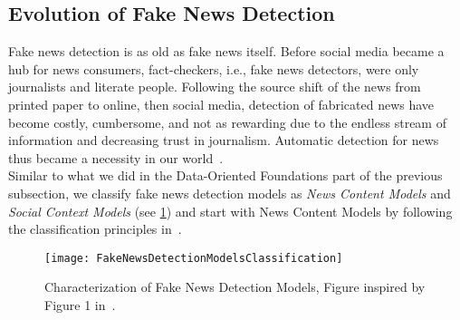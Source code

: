 \subsection{Evolution of Fake News Detection}
\label{subsec:fakeNewsDetection_Evolution}
Fake news detection is as old as fake news itself. Before social media became a hub for news consumers, fact-checkers, i.e., fake news
detectors, were only journalists and literate people. Following the source shift of the news from printed paper to online, then social
media, detection of fabricated news have become costly, cumbersome, and not as rewarding due to the endless stream of information and
decreasing trust in journalism. Automatic detection for news thus became a necessity in our world~\parencite{NewsInAnOnlineWorld_Chen}.\\
Similar to what we did in the Data-Oriented Foundations part of the previous subsection, we classify fake news detection models as
\emph{News Content Models} and  \emph{Social Context Models} (see \ref{fig:FakeNewsDetectionModelsClassification}) and start with News Content Models by following the classification principles in~\parencite{FakeNewsDetectionOnSocialMediaADataMiningPerspective_Shu}.\\
\begin{figure}
    \centering
    \texttt{[image: FakeNewsDetectionModelsClassification]}
    \caption[Characterization of Fake News Detection Models]{Characterization of Fake News Detection Models, Figure inspired by Figure 1 in~\cite{FakeNewsDetectionOnSocialMediaADataMiningPerspective_Shu}.}
    \label{fig:FakeNewsDetectionModelsClassification}
\end{figure}

